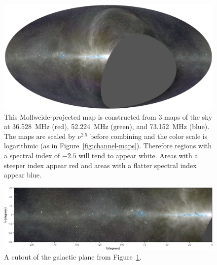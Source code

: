 \documentclass[twocolumn]{aastex61}
\begin{document}
\begin{figure}[t]
    \centering
    \includegraphics[width=\textwidth]{figures/three-color/ovro-lwa-sky-map.pdf}
    \caption{
        This Mollweide-projected map is constructed from 3 maps of the sky at 36.528~MHz (red),
        52.224~MHz (green), and 73.152~MHz (blue). The maps are scaled by $\nu^{2.5}$ before
        combining and the color scale is logarithmic (as in Figure~\ref{fig:channel-maps}).
        Therefore regions with a spectral index of $-2.5$ will tend to appear white. Areas with a
        steeper index appear red and areas with a flatter spectral index appear blue.
    }
    \label{fig:three-color}
\end{figure}

\begin{figure}[t]
    \centering
    \includegraphics[width=\textwidth]{figures/three-color/ovro-lwa-galactic-plane.pdf}
    \caption{
        A cutout of the galactic plane from Figure~\ref{fig:three-color}.
    }
    \label{fig:galactic-plane-cutout}
\end{figure}
\end{document}
